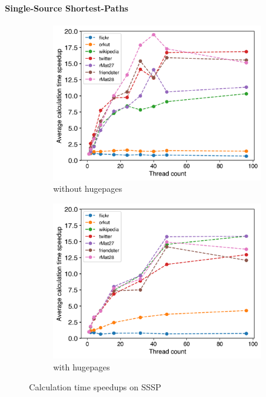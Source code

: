 \paragraph{Single-Source Shortest-Paths}
\begin{figure}
	\hfil
	\begin{subfigure}{0.48\columnwidth}
		\includegraphics[width=\linewidth]{../../plots/singleNodeSSSPGaloisThreads.png}
		\caption{without hugepages}
		\label{fig:galoisSpeedupSSSP_noHP}
	\end{subfigure}
	\begin{subfigure}{0.48\columnwidth}
		\includegraphics[width=\linewidth]{../../plots/singleNodeSSSPGaloisHPThreads.png}
		\caption{with hugepages}
		\label{fig:galoisSpeedupSSSP_HP}
	\end{subfigure}
	\hfil
	\caption{Calculation time speedups on SSSP}
	\label{fig:galoisSpeedupSSSP}
\end{figure}
